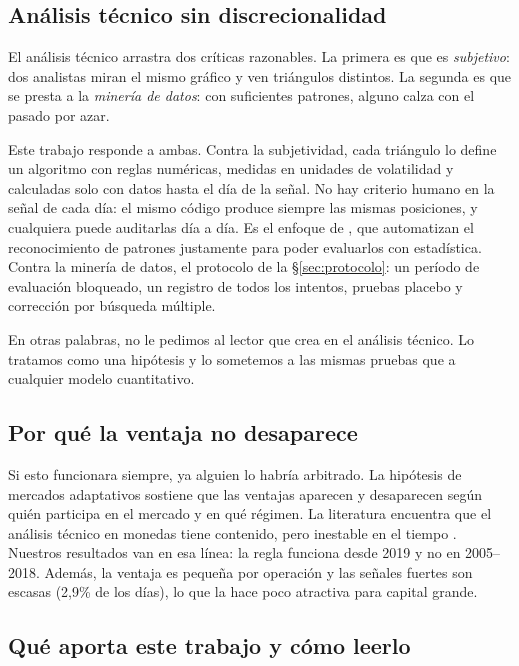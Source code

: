 \documentclass[10pt,a4paper]{article}
\begin{document}
\subsection{Análisis técnico sin discrecionalidad}\label{sec:sin_discrecion}

El análisis técnico arrastra dos críticas razonables. La primera es que es
\emph{subjetivo}: dos analistas miran el mismo gráfico y ven triángulos distintos. La
segunda es que se presta a la \emph{minería de datos}: con suficientes patrones, alguno
calza con el pasado por azar.

Este trabajo responde a ambas. Contra la subjetividad, cada triángulo lo define un
algoritmo con reglas numéricas, medidas en unidades de volatilidad y calculadas solo con
datos hasta el día de la señal. No hay criterio humano en la señal de cada día: el mismo
código produce siempre las mismas posiciones, y cualquiera puede auditarlas día a día.
Es el enfoque de \citet{lmw2000}, que automatizan el reconocimiento de patrones
justamente para poder evaluarlos con estadística. Contra la minería de datos, el
protocolo de la §\ref{sec:protocolo}: un período de evaluación bloqueado, un registro de
todos los intentos, pruebas placebo y corrección por búsqueda múltiple.

En otras palabras, no le pedimos al lector que crea en el análisis técnico. Lo tratamos
como una hipótesis y lo sometemos a las mismas pruebas que a cualquier modelo
cuantitativo.

\subsection{Por qué la ventaja no desaparece}

Si esto funcionara siempre, ya alguien lo habría arbitrado. La hipótesis de mercados
adaptativos \citep{lo2004} sostiene que las ventajas aparecen y desaparecen según quién
participa en el mercado y en qué régimen. La literatura encuentra que el análisis
técnico en monedas tiene contenido, pero inestable en el tiempo
\citep{osler2000,lmw2000,menkhoff2007}. Nuestros resultados van en esa línea: la regla
funciona desde 2019 y no en 2005--2018. Además, la ventaja es pequeña por operación y
las señales fuertes son escasas (2,9\% de los días), lo que la hace poco atractiva para
capital grande.

\subsection{Qué aporta este trabajo y cómo leerlo}
\end{document}
